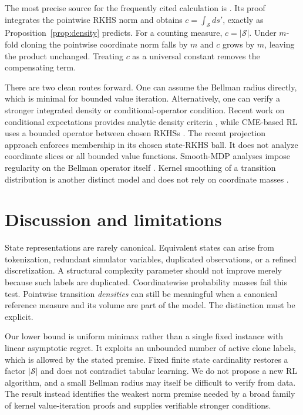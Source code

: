 \documentclass{article}
\newcommand{\cS}{\mathcal S}
\begin{document}
The most precise source for the frequently cited calculation is \citet[Lemma 3]{yeh2023sample}. Its proof integrates the pointwise RKHS norm and obtains $c=\int_{\cS}ds'$, exactly as Proposition~\ref{prop:density} predicts. For a counting measure, $c=|\cS|$. Under $m$-fold cloning the pointwise coordinate norm falls by $m$ and $c$ grows by $m$, leaving the product unchanged. Treating $c$ as a universal constant removes the compensating term.

There are two clean routes forward. One can assume the Bellman radius directly, which is minimal for bounded value iteration. Alternatively, one can verify a stronger integrated density or conditional-operator condition. Recent work on conditional expectations provides analytic density criteria \citep{park2020measure,hertel2026regularity}, while CME-based RL uses a bounded operator between chosen RKHSs \citep{chowdhury2023cme,kumar2025closure}. The recent projection approach enforces membership in its chosen state-RKHS ball. It does not analyze coordinate slices or all bounded value functions. Smooth-MDP analyses impose regularity on the Bellman operator itself \citep{maran2024local,maran2024smooth}. Kernel smoothing of a transition distribution is another distinct model and does not rely on coordinate masses \citep{domingues2021kernel}.

\section{Discussion and limitations}

State representations are rarely canonical. Equivalent states can arise from tokenization, redundant simulator variables, duplicated observations, or a refined discretization. A structural complexity parameter should not improve merely because such labels are duplicated. Coordinatewise probability masses fail this test. Pointwise transition \emph{densities} can still be meaningful when a canonical reference measure and its volume are part of the model. The distinction must be explicit.

Our lower bound is uniform minimax rather than a single fixed instance with linear asymptotic regret. It exploits an unbounded number of active clone labels, which is allowed by the stated premise. Fixed finite state cardinality restores a factor $|\cS|$ and does not contradict tabular learning. We do not propose a new RL algorithm, and a small Bellman radius may itself be difficult to verify from data. The result instead identifies the weakest norm premise needed by a broad family of kernel value-iteration proofs and supplies verifiable stronger conditions.
\end{document}
